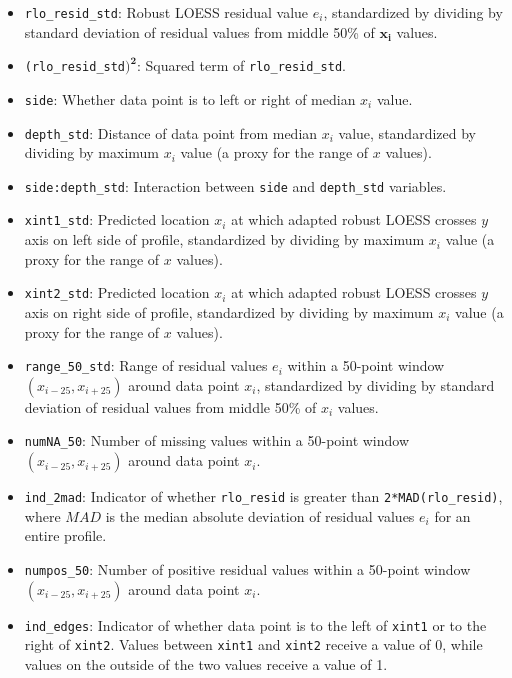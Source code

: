 \documentclass[12pt]{article}
\begin{document}
\begin{itemize}

\item[] \texttt{rlo\_resid\_std}: Robust LOESS residual value $e_i$, standardized by dividing by standard deviation of residual values from middle 50\% of $\mathbf{x_i}$ values.  

\item[] \texttt{(rlo\_resid\_std$\mathbf{)^2}$}: Squared term of \texttt{rlo\_resid\_std}.   

\item[] \texttt{side}: Whether data point is to left or right of median $x_i$ value.  

\item[] \texttt{depth\_std}: Distance of data point from median $x_i$ value, standardized by dividing by maximum $x_i$ value (a proxy for the range of $x$ values).  

\item[] \texttt{side:depth\_std}: Interaction between \texttt{side} and \texttt{depth\_std} variables.  

\item[] \texttt{xint1\_std}: Predicted location $x_i$ at which adapted robust LOESS crosses $y$ axis on left side of profile, standardized by dividing by maximum $x_i$ value (a proxy for the range of $x$ values).  

\item[] \texttt{xint2\_std}: Predicted location $x_i$ at which adapted robust LOESS crosses $y$ axis on right side of profile, standardized by dividing by maximum $x_i$ value (a proxy for the range of $x$ values).  

\item[] \texttt{range\_50\_std}: Range of residual values $e_i$ within a 50-point window $(x_{i-25}, x_{i+25})$ around data point $x_i$, standardized by dividing by standard deviation of residual values from middle 50\% of $x_i$ values.  

\item[] \texttt{numNA\_50}: Number of missing values within a 50-point window $(x_{i-25}, x_{i+25})$ around data point $x_i$.  

\item[] \texttt{ind\_2mad}: Indicator of whether \texttt{rlo\_resid} is greater than \texttt{2*MAD(rlo\_resid)}, where $MAD$ is the median absolute deviation of residual values $e_i$ for an entire profile.    

\item[] \texttt{numpos\_50}: Number of positive residual values within a 50-point window $(x_{i-25}, x_{i+25})$ around data point $x_i$.  

\item[] \texttt{ind\_edges}: Indicator of whether data point is to the left of \texttt{xint1} or to the right of \texttt{xint2}. Values between \texttt{xint1} and \texttt{xint2} receive a value of 0, while values on the outside of the two values receive a value of 1.  

\end{itemize}
\end{document}
